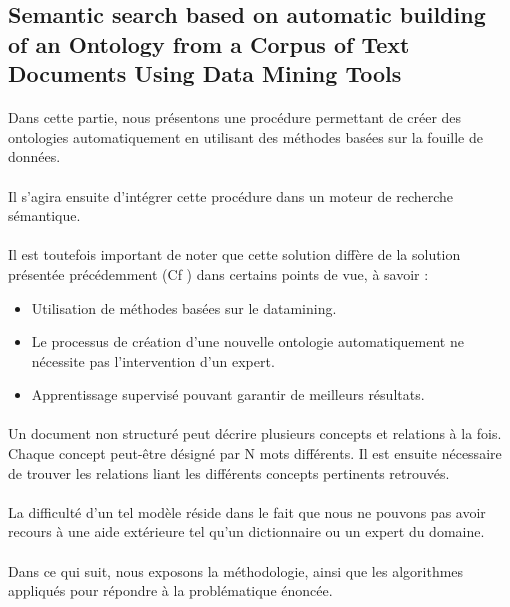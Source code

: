 \documentclass[12pt, a4paper, oneside]{book}
\begin{document}
\newpage
\subsection{Semantic search based on automatic building of an Ontology from a Corpus of Text Documents Using Data Mining Tools} 

\paragraph{}
Dans cette partie, nous présentons une procédure permettant de créer des ontologies automatiquement en utilisant des méthodes basées sur la fouille de données.\cite{article}
\paragraph{}
Il s'agira ensuite d'intégrer cette procédure dans un moteur de recherche sémantique.
\paragraph{} 
Il est toutefois important de noter que cette solution diffère de la solution présentée précédemment (Cf ) dans certains points de vue, à savoir : \\
\begin{itemize}
\item Utilisation de méthodes basées sur le datamining.
\item Le processus de création d'une nouvelle ontologie automatiquement ne nécessite pas l'intervention d'un expert.
\item Apprentissage supervisé pouvant garantir de meilleurs résultats.
\end{itemize}

\paragraph{} 
Un document non structuré peut décrire plusieurs concepts et relations à la fois.
Chaque concept peut-être désigné par N mots différents.
Il est ensuite nécessaire de trouver les relations liant les différents concepts pertinents retrouvés.\citep{process1}
\paragraph{} 
La difficulté d'un tel modèle réside dans le fait que nous ne pouvons pas avoir recours à une aide extérieure tel qu'un dictionnaire ou un expert du domaine. 
\paragraph{} 
Dans ce qui suit, nous exposons la méthodologie, ainsi que les algorithmes 
appliqués pour répondre à la problématique énoncée. 
\end{document}
